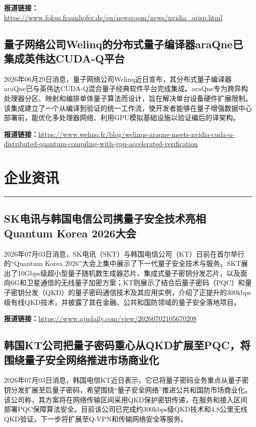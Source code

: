 \documentclass[12pt,a4paper]{ctexart}
\begin{document}
\noindent\textbf{报道链接：}\url{https://www.fokus.fraunhofer.de/en/newsroom/news/nvidia\_qrisp.html}

\subsection{ 量子网络公司Welinq的分布式量子编译器araQne已集成英伟达CUDA-Q平台 }

2026年06月29日消息，量子网络公司Welinq近日宣布，其分布式量子编译器araQne已与英伟达CUDA-Q混合量子经典软件平台完成集成。araQne专为跨异构处理器分区、映射和编排单体量子算法而设计，旨在解决单台设备硬件扩展限制。该集成建立了一个从编译到验证的统一工作流，使开发者能够在量子增强数据中心部署前，能优化多处理器网络、利用GPU模拟基础设施以验证编后的译架构。

\noindent\textbf{报道链接：}\url{https://www.welinq.fr/blog/welinqs-araqne-meets-nvidia-cuda-q-distributed-quantum-compiling-with-gpu-accelerated-verification}




\newpage
\section{企业资讯}
\vspace{-0.5em}
\noindent\rule{\linewidth}{1.5pt}

\subsection{ SK电讯与韩国电信公司携量子安全技术亮相Quantum Korea 2026大会 }

2026年07月03日消息，SK电讯（SKT）与韩国电信公司（KT）日前在首尔举行的“Quantum Korea 2026”大会上集中展示了下一代量子安全技术与服务。SKT展出了10Gbps级超小型量子随机数生成器芯片、集成式量子密钥分发芯片，以及面向6G和卫星通信的无线量子加密方案；KT则展示了结合后量子密码（PQC）和量子密钥分发（QKD）的量子密码通信技术及其应用实例，介绍了正提升的300kbps级有线QKD技术，并披露了其在金融、公共和国防领域的量子安全落地项目。

\noindent\textbf{报道链接：}\url{https://www.ajudaily.com/view/20260702105670208}

\subsection{ 韩国KT公司把量子密码重心从QKD扩展至PQC，将围绕量子安全网络推进市场商业化 }

2026年07月03日消息，韩国电信KT近日表示，它已将量子密码业务重点从量子密钥分发扩展至后量子密码，希望围绕“量子安全网络”推进公共和国防市场商业化。该公司称，其方案将在网络传输区间采用QKD保护密钥传递，在服务和接入区间部署PQC保障算法安全。目前该公司已完成约300kbps级QKD技术和4.8公里无线QKD验证，下一步将扩展至Q-VPN和传输网络安全等服务。
\end{document}
